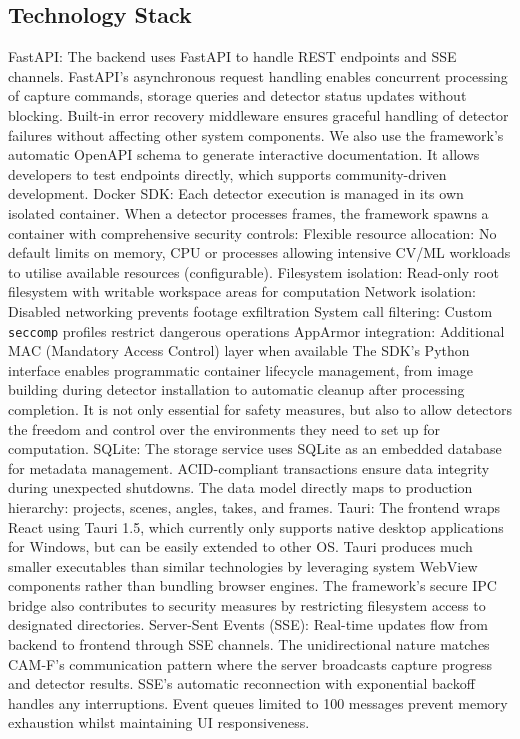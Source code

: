 \subsection{Technology Stack}
FastAPI: The backend uses FastAPI to handle REST endpoints and SSE channels. FastAPI's asynchronous request handling enables concurrent processing of capture commands, storage queries and detector status updates without blocking. Built-in error recovery middleware ensures graceful handling of detector failures without affecting other system components. We also use the framework's automatic OpenAPI schema to generate interactive documentation. It allows developers to test endpoints directly, which supports community-driven development.
Docker SDK: Each detector execution is managed in its own isolated container. When a detector processes frames, the framework spawns a container with comprehensive security controls:
Flexible resource allocation: No default limits on memory, CPU or processes allowing intensive CV/ML workloads to utilise available resources (configurable). 
Filesystem isolation: Read-only root filesystem with writable workspace areas for computation
Network isolation: Disabled networking prevents footage exfiltration
System call filtering: Custom \verb|seccomp| profiles restrict dangerous operations
AppArmor integration: Additional MAC (Mandatory Access Control) layer when available
The SDK's Python interface enables programmatic container lifecycle management, from image building during detector installation to automatic cleanup after processing completion. It is not only essential for safety measures, but also to allow detectors the freedom and control over the environments they need to set up for computation.
SQLite: The storage service uses SQLite as an embedded database for metadata management. ACID-compliant transactions ensure data integrity during unexpected shutdowns. The data model directly maps to production hierarchy: projects, scenes, angles, takes, and frames.
Tauri: The frontend wraps React using Tauri 1.5, which currently only supports native desktop applications for Windows, but can be easily extended to other OS. Tauri produces much smaller executables than similar technologies by leveraging system WebView components rather than bundling browser engines. The framework's secure IPC bridge also contributes to security measures by restricting filesystem access to designated directories.
Server-Sent Events (SSE): Real-time updates flow from backend to frontend through SSE channels. The unidirectional nature matches CAM-F's communication pattern where the server broadcasts capture progress and detector results. SSE's automatic reconnection with exponential backoff handles any interruptions. Event queues limited to 100 messages prevent memory exhaustion whilst maintaining UI responsiveness.
